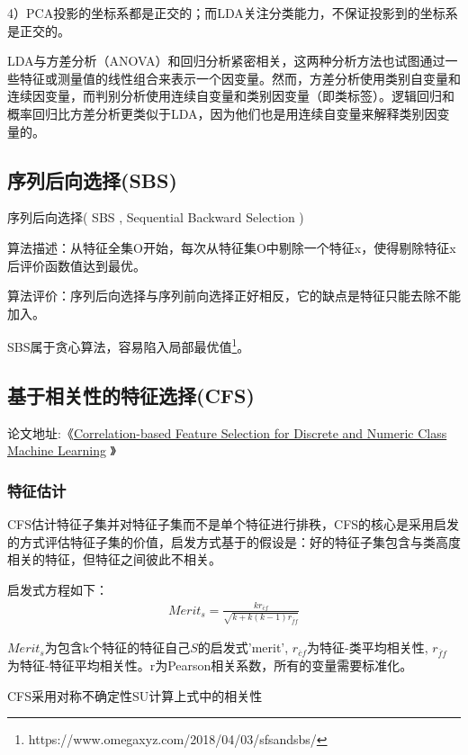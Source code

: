 4）PCA投影的坐标系都是正交的；而LDA关注分类能力，不保证投影到的坐标系是正交的。

LDA与方差分析（ANOVA）和回归分析紧密相关，这两种分析方法也试图通过一些特征或测量值的线性组合来表示一个因变量。然而，方差分析使用类别自变量和连续因变量，而判别分析使用连续自变量和类别因变量（即类标签）。逻辑回归和概率回归比方差分析更类似于LDA，因为他们也是用连续自变量来解释类别因变量的。

\subsection{序列后向选择(SBS)}

序列后向选择( SBS , Sequential Backward Selection )

算法描述：从特征全集O开始，每次从特征集O中剔除一个特征x，使得剔除特征x后评价函数值达到最优。

算法评价：序列后向选择与序列前向选择正好相反，它的缺点是特征只能去除不能加入。

SBS属于贪心算法，容易陷入局部最优值\footnote{https://www.omegaxyz.com/2018/04/03/sfsandsbs/}。

\subsection{基于相关性的特征选择(CFS)}

论文地址:《\href{https://xueshu.baidu.com/usercenter/paper/show?paperid=111u0200ht6j0m202s2n0j40rm579580&site=xueshu_se&hitarticle=1}{Correlation-based Feature Selection for Discrete and Numeric Class Machine Learning}
》

\subsubsection{特征估计}

CFS估计特征子集并对特征子集而不是单个特征进行排秩，CFS的核心是采用启发的方式评估特征子集的价值，启发方式基于的假设是：好的特征子集包含与类高度相关的特征，但特征之间彼此不相关。

启发式方程如下：
\begin{align}
Merit_s = \frac{kr_{\overline{c}f}}{\sqrt{k+k(k-1)r_{\overline{f}f}}}
\end{align}

$Merit_s$为包含k个特征的特征自己$S$的启发式’merit’, $r_{\overline{c}f}$为特征-类平均相关性, $r_{\overline{f}f}$ 为特征-特征平均相关性。r为Pearson相关系数，所有的变量需要标准化。

CFS采用对称不确定性SU计算上式中的相关性

